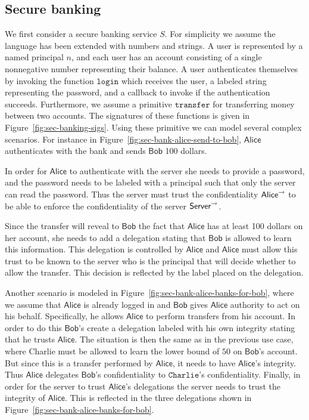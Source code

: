 \subsection{Secure banking}
We first consider a secure banking service $S$. For simplicity we assume the language has been extended with numbers and strings. A user is represented by a named principal $n$, and each user has an account consisting of a single nonnegative number representing their balance. A user authenticates themselves by invoking the function $\mathtt{login}$ which receives the user, a labeled string representing the password, and a callback to invoke if the authentication succeeds. Furthermore, we assume a primitive $\mathtt{transfer}$ for transferring money between two accounts. The signatures of these functions is given in Figure~\ref{fig:sec-banking-sigs}.
Using these primitive we can model several complex scenarios. For instance in Figure~\ref{fig:sec-bank-alice-send-to-bob}, $\mathsf{Alice}$ authenticates with the bank and sends $\mathsf{Bob}$ 100 dollars.

In order for $\mathsf{Alice}$ to authenticate with the server she needs to provide a password, and the password needs to be labeled with a principal such that only the server can read the password. Thus the server must trust the confidentiality $\mathsf{Alice}^{\rightarrow}$ to be able to enforce the confidentiality of the server $\mathsf{Server}^{\rightarrow}$. 

Since the transfer will reveal to $\mathsf{Bob}$ the fact that $\mathsf{Alice}$ has at least 100 dollars on her account, she needs to add a delegation stating that $\mathsf{Bob}$ is allowed to learn this information. This delegation is controlled by $\mathsf{Alice}$ and $\mathsf{Alice}$ must allow this trust to be known to the server who is the principal that will decide whether to allow the transfer. This decision is reflected by the label placed on the delegation.

Another scenario is modeled in Figure~\ref{fig:sec-bank-alice-banks-for-bob}, where we assume that $\mathsf{Alice}$ is already logged in and $\mathsf{Bob}$ gives $\mathsf{Alice}$ authority to act on his behalf. Specifically, he allows $\mathsf{Alice}$ to perform transfers from his account. In order to do this $\mathsf{Bob}$'s create a delegation labeled with his own integrity stating that he trusts $\mathsf{Alice}$. The situation is then the same as in the previous use case, where Charlie must be allowed to learn the lower bound of $50$ on $\mathsf{Bob}$'s account. But since this is a transfer performed by $\mathsf{Alice}$, it needs to have $\mathsf{Alice}$'s integrity. Thus $\mathsf{Alice}$ delegates $\mathsf{Bob}$'s confidentiality to $\mathtt{Charlie}$'s confidentiality. Finally, in order for the server to trust $\mathsf{Alice}$'s delegations the server needs to trust the integrity of $\mathsf{Alice}$. This is reflected in the three delegations shown in Figure~\ref{fig:sec-bank-alice-banks-for-bob}.

